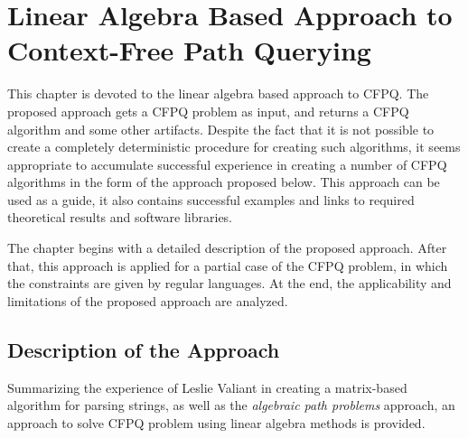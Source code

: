 \chapter{Linear Algebra Based Approach to Context-Free Path Querying}\label{ch:ch2}
This chapter is devoted to the linear algebra based approach to CFPQ. The proposed approach gets a CFPQ problem as input, and returns a CFPQ algorithm and some other artifacts. Despite the fact that it is not possible to create a completely deterministic procedure for creating such algorithms, it seems appropriate to accumulate successful experience in creating a number of CFPQ algorithms in the form of the approach proposed below. This approach can be used as a guide, it also contains successful examples and links to required theoretical results and software libraries.%

The chapter begins with a detailed description of the proposed approach. After that, this approach is applied for a partial case of the CFPQ problem, in which the constraints are given by regular languages. At the end, the applicability and limitations of the proposed approach are analyzed.

\section{Description of the Approach}
Summarizing the experience of Leslie Valiant in creating a matrix-based algorithm for parsing strings, as well as the \textit{algebraic path problems} approach, an approach to solve CFPQ problem using linear algebra methods is provided.

